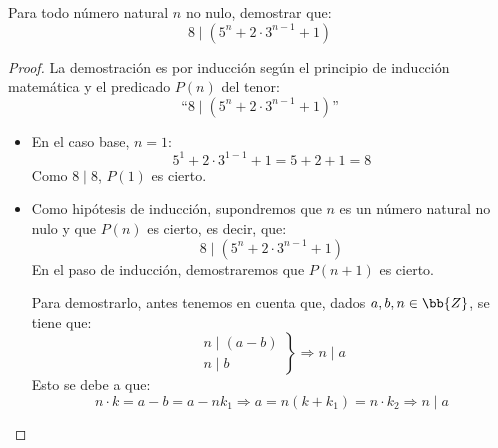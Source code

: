 \begin{ejercicio}
    Para todo número natural $n$ no nulo, demostrar que:
    $$8\mid \left(5^n + 2\cdot 3^{n-1}+1\right)$$

    \begin{proof}
        La demostración es por inducción según el principio de inducción matemática y el predicado $P(n)$ del tenor:
        $$\text{``}8\mid \left(5^n + 2\cdot 3^{n-1}+1\right)\text{''}$$

        \begin{itemize}
            \item En el caso base, $n=1$:
                $$5^1 + 2\cdot 3^{1-1}+1 = 5+2+1 = 8$$
                Como $8\mid 8$, $P(1)$ es cierto.

            \item Como hipótesis de inducción, supondremos que $n$ es un número natural no nulo y que $P(n)$ es cierto, es decir, que:
                $$8\mid \left(5^n + 2\cdot 3^{n-1}+1\right)$$
                En el paso de inducción, demostraremos que $P(n+1)$ es cierto.

                Para demostrarlo, antes tenemos en cuenta que, dados $a,b,n\in \bb{Z}$, se tiene que:
                \begin{equation*}
                    \left.\begin{array}{l}
                        n\mid (a-b) \\
                        n\mid b
                    \end{array} \right\} \Longrightarrow n\mid a
                \end{equation*}
                Esto se debe a que:
                \begin{equation*}
                    n\cdot k = a-b = a-nk_1 \Longrightarrow a = n(k+k_1) = n\cdot k_2 \Longrightarrow n\mid a
                \end{equation*}


\end{itemize}
\end{proof}
\end{ejercicio}

